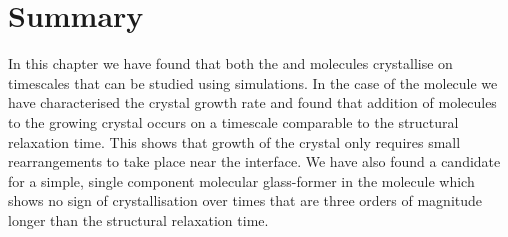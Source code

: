 \section{Summary}

In this chapter we have found that both the \done and \dcon molecules crystallise on timescales that can be studied using simulations. In the case of the \done molecule we have characterised the crystal growth rate and found that addition of molecules to the growing crystal occurs on a timescale comparable to the structural relaxation time. This shows that growth of the crystal only requires small rearrangements to take place near the interface. We have also found a candidate for a simple, single component molecular glass-former in the \tri molecule which shows no sign of crystallisation over times that are three orders of magnitude longer than the structural relaxation time.
